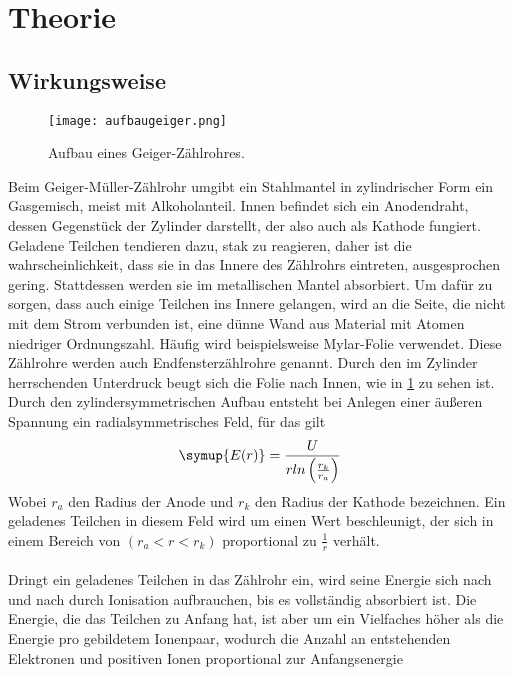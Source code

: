 \section{Theorie}
\label{sec:Theorie}

\subsection{Wirkungsweise}
\begin{figure}
 \centering
 \texttt{[image: aufbaugeiger.png]}
 \caption{Aufbau eines Geiger-Zählrohres.}
 \label{fig:aufn}
\end{figure}

Beim Geiger-Müller-Zählrohr umgibt ein Stahlmantel in zylindrischer Form
ein Gasgemisch, meist mit Alkoholanteil. Innen befindet sich ein Anodendraht,
dessen Gegenstück der Zylinder darstellt, der also auch als Kathode fungiert.\\
Geladene Teilchen tendieren dazu, stak zu reagieren, daher ist die wahrscheinlichkeit,
dass sie in das Innere des Zählrohrs eintreten, ausgesprochen gering. 
Stattdessen werden sie im metallischen Mantel absorbiert. Um dafür zu 
sorgen, dass auch einige Teilchen ins Innere gelangen, wird an die Seite,
die nicht mit dem Strom verbunden ist, eine dünne Wand aus Material mit Atomen
niedriger Ordnungszahl. Häufig wird beispielsweise Mylar-Folie verwendet. 
Diese Zählrohre werden auch Endfensterzählrohre genannt. Durch den im Zylinder
herrschenden Unterdruck beugt sich die Folie nach Innen, wie in \ref{fig:aufn} 
zu sehen ist.\\
Durch den zylindersymmetrischen Aufbau entsteht bei Anlegen einer äußeren Spannung
ein radialsymmetrisches Feld, für das gilt
\begin{equation}
\symup{E(r) }= \frac{U}{r ln\left(\frac{r_k}{r_a} \right) } 
\end{equation}
Wobei $r_a$ den Radius der Anode und $r_k$ den Radius der Kathode bezeichnen.
Ein geladenes Teilchen in diesem Feld wird um einen Wert beschleunigt, der
sich in einem Bereich von $\left( r_a < r < r_k \right)$ proportional zu $\frac{1}{r}$ 
verhält. \\
\\
Dringt ein geladenes Teilchen in das Zählrohr ein, wird seine Energie 
sich nach und nach durch Ionisation aufbrauchen, bis es vollständig absorbiert
ist. Die Energie, die das Teilchen zu Anfang hat, ist aber um ein Vielfaches
höher als die Energie pro gebildetem Ionenpaar, wodurch die Anzahl an 
entstehenden Elektronen und positiven Ionen proportional zur Anfangsenergie
